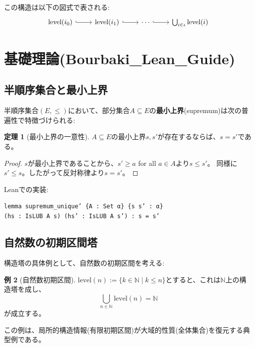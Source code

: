 \documentclass[a4paper,12pt]{ltjsarticle}
\theoremstyle{definition}
\newtheorem{theorem}{定理}[section]
\newtheorem{example}[theorem]{例}
\begin{document}
この構造は以下の図式で表される:
\begin{equation*}
\begin{tikzcd}
\text{level}(i_0) \arrow[r, hook] & \text{level}(i_1) \arrow[r, hook] & \cdots \arrow[r, hook] & \bigcup_{i \in \iota} \text{level}(i)
\end{tikzcd}
\end{equation*}

\section{基礎理論(Bourbaki\_Lean\_Guide)}

\subsection{半順序集合と最小上界}
半順序集合$(E, \le)$において、部分集合$A \subseteq E$の\textbf{最小上界}(supremum)は次の普遍性で特徴づけられる:

\begin{theorem}[最小上界の一意性]\label{thm:supremum-unique}
$A \subseteq E$の最小上界$s, s'$が存在するならば、$s = s'$である。
\end{theorem}

\begin{proof}
$s$が最小上界であることから、$s' \ge a$ for all $a \in A$より$s \le s'$。
同様に$s' \le s$。したがって反対称律より$s = s'$。
\end{proof}

Leanでの実装:
\begin{tcolorbox}
\texttt{lemma supremum\_unique' \{A : Set α\} \{s s' : α\}\\
\quad(hs : IsLUB A s) (hs' : IsLUB A s') : s = s'}
\end{tcolorbox}

\subsection{自然数の初期区間塔}
構造塔の具体例として、自然数の初期区間を考える:

\begin{example}[自然数初期区間]\label{ex:nat-tower}
$\text{level}(n) := \{k \in \mathbb{N} \mid k \le n\}$とすると、これは$\mathbb{N}$上の構造塔を成し、
\[
\bigcup_{n \in \mathbb{N}} \text{level}(n) = \mathbb{N}
\]
が成立する。
\end{example}

この例は、局所的構造情報(有限初期区間)が大域的性質(全体集合)を復元する典型例である。
\end{document}
